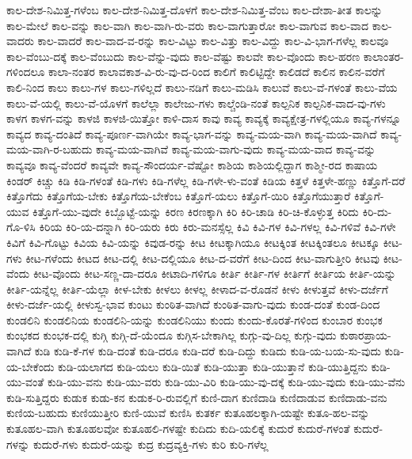 {ಕಾಲ-ದೇಶ-ನಿಮಿತ್ತ-ಗಳೆಂಬ
ಕಾಲ-ದೇಶ-ನಿಮಿತ್ತ-ದೊಳಗೆ
ಕಾಲ-ದೇಶ-ನಿಮಿತ್ತ-ವೆಂಬ
ಕಾಲ-ದೇಶಾ-ತೀತ
ಕಾಲನ್ನು
ಕಾಲ-ಮೇಲೆ
ಕಾಲ-ವನ್ನು
ಕಾಲ-ವಾಗಿ
ಕಾಲ-ವಾಗಿ-ರು-ವರು
ಕಾಲ-ವಾಗುತ್ತಾರೋ
ಕಾಲ-ವಾಗುವ
ಕಾಲ-ವಾದ
ಕಾಲ-ವಾದರು
ಕಾಲ-ವಾದರೆ
ಕಾಲ-ವಾದ-ವ-ರನ್ನು
ಕಾಲ-ವಿಟ್ಟು
ಕಾಲ-ವಿತ್ತು
ಕಾಲ-ವಿದ್ದು
ಕಾಲ-ವಿ-ಭಾಗ-ಗಳೆಲ್ಲ
ಕಾಲವೂ
ಕಾಲ-ವೆಂಬು-ದಕ್ಕೆ
ಕಾಲ-ವೆಂಬುದು
ಕಾಲ-ವೆನ್ನು-ವುದು
ಕಾಲ-ವೆಷ್ಟು
ಕಾಲವೇ
ಕಾಲ-ವೊಂದು
ಕಾಲ-ಹರಣ
ಕಾಲಾಂತರ-ಗಳಿಂದಲೂ
ಕಾಲಾ-ನಂತರ
ಕಾಲಾವಕಾಶ-ವಿ-ರು-ವು-ದ-ರಿಂದ
ಕಾಲಿಗೆ
ಕಾಲಿಟ್ಟಿದ್ದೇ
ಕಾಲಿಡದೆ
ಕಾಲಿನ
ಕಾಲಿನ-ವರೆಗೆ
ಕಾಲಿ-ನಿಂದ
ಕಾಲು
ಕಾಲು-ಗಳ
ಕಾಲು-ಗಳಿಲ್ಲದೆ
ಕಾಲು-ನಡಿಗೆ
ಕಾಲು-ಮಡಿಸಿ
ಕಾಲುವೆ
ಕಾಲು-ವೆ-ಗಳಂತೆ
ಕಾಲು-ವೆಯ
ಕಾಲು-ವೆ-ಯಲ್ಲಿ
ಕಾಲು-ವೆ-ಯೊಳಗೆ
ಕಾಲೆಲ್ಲಾ
ಕಾಲೇಜು-ಗಳು
ಕಾಲ್ಚೆಂಡಿ-ನಂತೆ
ಕಾಲ್ಪನಿಕ
ಕಾಲ್ಪನಿಕ-ವಾದ-ವು-ಗಳು
ಕಾಳಗ
ಕಾಳಗ-ವನ್ನು
ಕಾಳಜಿ
ಕಾಳಜಿ-ಯಿತ್ತೋ
ಕಾಳಿ-ದಾಸ
ಕಾವು
ಕಾವ್ಯ
ಕಾವ್ಯಕ್ಕೆ
ಕಾವ್ಯಕ್ಷೇತ್ರ-ಗಳಲ್ಲಿಯೂ
ಕಾವ್ಯ-ಗಳನ್ನೂ
ಕಾವ್ಯದ
ಕಾವ್ಯ-ದಂತಿದೆ
ಕಾವ್ಯ-ಪೂರ್ಣ-ವಾಗಿಯೇ
ಕಾವ್ಯ-ಭಾಗ-ವನ್ನು
ಕಾವ್ಯ-ಮಯ-ವಾಗಿ
ಕಾವ್ಯ-ಮಯ-ವಾಗಿದೆ
ಕಾವ್ಯ-ಮಯ-ವಾಗಿ-ರ-ಬಹುದು
ಕಾವ್ಯ-ಮಯ-ವಾಗಿವೆ
ಕಾವ್ಯ-ಮಯ-ವಾಗು-ವುದು
ಕಾವ್ಯ-ಮಯ-ವಾದ
ಕಾವ್ಯ-ವನ್ನು
ಕಾವ್ಯವೂ
ಕಾವ್ಯ-ವೆಂದರೆ
ಕಾವ್ಯವೇ
ಕಾವ್ಯ-ಸೌಂದರ್ಯ-ವೆಷ್ಟೋ
ಕಾಶಿಯ
ಕಾಶಿಯಲ್ಲಿದ್ದಾಗ
ಕಾಶ್ಮೀ-ರದ
ಕಾಷಾಯ
ಕಿಂಡರ್
ಕಿಚ್ಚು
ಕಿಡಿ
ಕಿಡಿ-ಗಳಂತೆ
ಕಿಡಿ-ಗಳು
ಕಿಡಿ-ಗಳೆಲ್ಲ
ಕಿಡಿ-ಗಳೇ-ಳು-ವಂತೆ
ಕಿಡಿಯ
ಕಿತ್ತಳೆ
ಕಿತ್ತಳೇ-ಹಣ್ಣು
ಕಿತ್ತೊಗೆ-ದರೆ
ಕಿತ್ತೊಗೆದು
ಕಿತ್ತೊಗೆಯ-ಬೇಕು
ಕಿತ್ತೊಗೆಯ-ಬೇಕೆಂಬ
ಕಿತ್ತೊಗೆ-ಯಲು
ಕಿತ್ತೊಗೆ-ಯಿರಿ
ಕಿತ್ತೊಗೆಯುತ್ತಾರೆ
ಕಿತ್ತೊಗೆ-ಯುವ
ಕಿತ್ತೊಗೆ-ಯು-ವುದೇ
ಕಿಬ್ಬೊಟ್ಟೆ-ಯನ್ನು
ಕಿರಣ
ಕಿರಣಕ್ಕಾಗಿ
ಕಿರಿ
ಕಿರಿ-ಚಾಡಿ
ಕಿರಿ-ಚಿ-ಕೊಳ್ಳುತ್ತ
ಕಿರಿದು
ಕಿರಿ-ದು-ಗೊ-ಳಿಸಿ
ಕಿರಿಯ
ಕಿರಿ-ಯ-ದನ್ನಾಗಿ
ಕಿರಿ-ಯರು
ಕಿರು
ಕಿರು-ಮನಸ್ಸೆಲ್ಲ
ಕಿವಿ
ಕಿವಿ-ಗಳ
ಕಿವಿ-ಗಳಲ್ಲ
ಕಿವಿ-ಗಳಿವೆ
ಕಿವಿ-ಗಳೇ
ಕಿವಿಗೆ
ಕಿವಿ-ಗೊಟ್ಟು
ಕಿವಿಯ
ಕಿವಿ-ಯನ್ನು
ಕಿವುಡ-ರನ್ನು
ಕೀಟ
ಕೀಟಕ್ಕಾಗಿಯೂ
ಕೀಟಕ್ಕಿಂತ
ಕೀಟಕ್ಕಿಂತಲೂ
ಕೀಟಕ್ಕೂ
ಕೀಟ-ಗಳು
ಕೀಟ-ಗಳೆಂದು
ಕೀಟದ
ಕೀಟ-ದಲ್ಲಿ
ಕೀಟ-ದಲ್ಲಿಯೂ
ಕೀಟ-ದ-ವರೆಗೆ
ಕೀಟ-ದಿಂದ
ಕೀಟ-ವಾಗುತ್ತೀರಿ
ಕೀಟವು
ಕೀಟ-ವೆಂದು
ಕೀಟ-ವೊಂದು
ಕೀಟ-ಸಣ್ಣ-ದಾ-ದರೂ
ಕೀಟಾದಿ-ಗಳಿಗೂ
ಕೀರ್ತಿ
ಕೀರ್ತಿ-ಗಳ
ಕೀರ್ತಿಗೆ
ಕೀರ್ತಿಯ
ಕೀರ್ತಿ-ಯನ್ನು
ಕೀರ್ತಿ-ಯನ್ನೆಲ್ಲ
ಕೀರ್ತಿ-ಯೆಲ್ಲಾ
ಕೀಳ-ಬೇಕು
ಕೀಳಲು
ಕೀಳಲ್ಲ
ಕೀಳಾದ-ವ-ರೊಡನೆ
ಕೀಳು
ಕೀಳುತ್ತವೆ
ಕೀಳು-ದರ್ಜೆಗೆ
ಕೀಳು-ದರ್ಜೆ-ಯಲ್ಲಿ
ಕೀಳುಸ್ವ-ಭಾವ
ಕುಂಟು
ಕುಂಠಿತ-ವಾಗಿದೆ
ಕುಂಠಿತ-ವಾಗು-ವುದು
ಕುಂಡ-ದಂತೆ
ಕುಂಡ-ದಿಂದ
ಕುಂಡಲಿನಿ
ಕುಂಡಲಿನಿಯ
ಕುಂಡಲಿನಿ-ಯನ್ನು
ಕುಂಡಲಿನಿಯು
ಕುಂದು
ಕುಂದು-ಕೊರತೆ-ಗಳಿಂದ
ಕುಂಬಾರ
ಕುಂಭಕ
ಕುಂಭಕದ
ಕುಂಭಕ-ದಲ್ಲಿ
ಕುಗ್ಗಿ
ಕುಗ್ಗಿ-ದೆ-ಯೆಂದೂ
ಕುಗ್ಗಿಸ-ಬೇಕಾಗಿಲ್ಲ
ಕುಗ್ಗು-ವು-ದಿಲ್ಲ
ಕುಗ್ಗು-ವುದು
ಕುಠಾರಪ್ರಾಯ-ವಾಗಿದೆ
ಕುಡಿ
ಕುಡಿ-ಕೆ-ಗಳ
ಕುಡಿ-ದಂತೆ
ಕುಡಿ-ದರೂ
ಕುಡಿ-ದರೆ
ಕುಡಿ-ದಿದ್ದು
ಕುಡಿದು
ಕುಡಿ-ಯ-ಬಯ-ಸು-ವುದು
ಕುಡಿ-ಯ-ಬೇಕೆಂದು
ಕುಡಿ-ಯಲಾಗದ
ಕುಡಿ-ಯಲು
ಕುಡಿ-ಯಿತೆ
ಕುಡಿ-ಯುತ್ತಾ
ಕುಡಿ-ಯುತ್ತಾನೆ
ಕುಡಿ-ಯುತ್ತಿದ್ದನು
ಕುಡಿ-ಯು-ವಂತೆ
ಕುಡಿ-ಯು-ವನು
ಕುಡಿ-ಯು-ವರು
ಕುಡಿ-ಯು-ವಿರಿ
ಕುಡಿ-ಯು-ವು-ದಕ್ಕೆ
ಕುಡಿ-ಯು-ವುದು
ಕುಡಿ-ಯು-ವೆನು
ಕುಡಿ-ಸುತ್ತಿದ್ದರು
ಕುಡುಕ
ಕುಡು-ಕನ
ಕುಡುಕ-ರಿ-ರುವಲ್ಲಿಗೆ
ಕುಣಿ-ದಾಗ
ಕುಣಿದಾಡಿ
ಕುಣಿದಾಡುವ
ಕುಣಿದಾಡು-ವನು
ಕುಣಿಯ-ಬಹುದು
ಕುಣಿಯುತ್ತೀರಿ
ಕುಣಿ-ಯುವೆ
ಕುಣಿಸಿ
ಕುತರ್ಕ
ಕುತೂಹಲಕ್ಕಾಗಿ-ಯಷ್ಟೇ
ಕುತೂ-ಹಲ-ವನ್ನು
ಕುತೂಹಲ-ವಾಗಿ
ಕುತೂಹಲವೋ
ಕುತೂಹಲಿ-ಗಳಷ್ಟೇ
ಕುದಿದು
ಕುದಿ-ಯಲಿಕ್ಕೆ
ಕುದುರೆ
ಕುದುರೆ-ಗಳಂತೆ
ಕುದುರೆ-ಗಳನ್ನು
ಕುದುರೆ-ಗಳು
ಕುದುರೆ-ಯನ್ನು
ಕುದ್ರ
ಕುದ್ರವ್ಯಕ್ತಿ-ಗಳು
ಕುರಿ
ಕುರಿ-ಗಳೆಲ್ಲ
}

